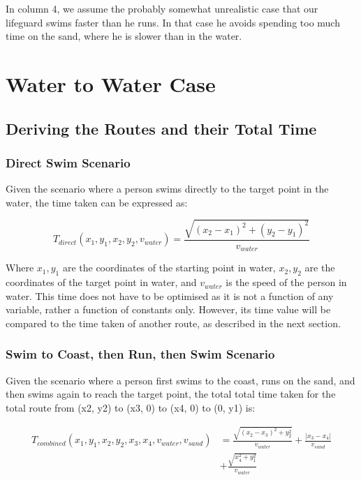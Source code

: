 \documentclass[11pt, a4paper]{article}
\begin{document}
In column 4, we assume the probably somewhat unrealistic case that our lifeguard swims faster than he runs.
In that case he avoids spending too much time on the sand, where he is slower than in the water.

\section{Water to Water Case}

\subsection{Deriving the Routes and their Total Time}

\subsubsection{Direct Swim Scenario}

Given the scenario where a person swims directly to the target point in the water, the time taken can be expressed as:

\[ T_{direct}(x_1, y_1, x_2, y_2, v_{water}) = \frac{\sqrt{(x_2 - x_1)^2 + (y_2 - y_1)^2}}{v_{water}} \]

Where \( x_1, y_1 \) are the coordinates of the starting point in water, \( x_2, y_2 \)
are the coordinates of the target point in water, and \( v_{water} \) is the speed of the person in water.
This time does not have to be optimised as it is not a function of any variable, rather a function of constants only.
However, its time value will be compared to the time taken of another route, as described in the next section.

\subsubsection{Swim to Coast, then Run, then Swim Scenario}

Given the scenario where a person first swims to the coast, runs on the sand, and then swims again to reach the
target point, the total
total time taken for the total route from (x2, y2) to (x3, 0) to (x4, 0) to (0, y1) is:


\begin{align*}
T_{combined}(x_1, y_1, x_2, y_2, x_3, x_4, v_{water}, v_{sand}) &= \frac{\sqrt{(x_2 - x_3)^2 + y_2^2}}{v_{water}} + \frac{|x_3 - x_4|}{v_{sand}} \\
&+ \frac{\sqrt{x_4^2 + y_1^2}}{v_{water}}
\end{align*}
\end{document}
